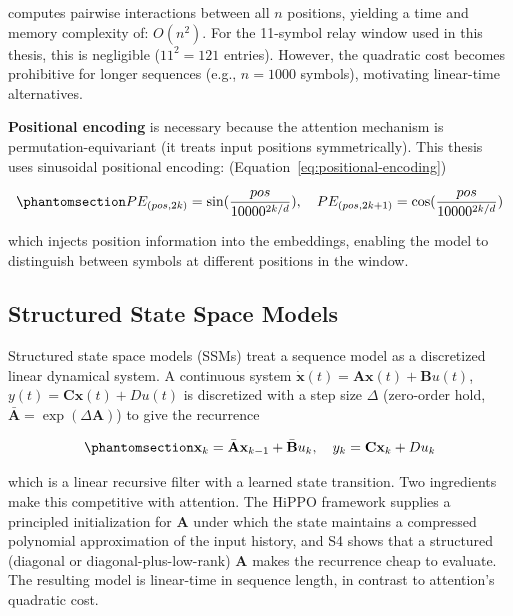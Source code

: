 computes pairwise interactions between all \(n\) positions, yielding a time and memory complexity of: $O(n^2)$. For the 11-symbol relay window used in this thesis, this is negligible (\(11^2 = 121\) entries). However, the quadratic cost becomes prohibitive for longer sequences (e.g., \(n = 1000\) symbols), motivating linear-time alternatives.

\textbf{Positional encoding} is necessary because the attention mechanism is permutation-equivariant (it treats input positions symmetrically). This thesis uses sinusoidal positional encoding: (Equation~\ref{eq:positional-encoding})

\begin{equation}\protect\phantomsection\label{eq:positional-encoding}{PE_{(pos, 2k)} = \sin(\frac{pos}{10000^{2k/d}}), \quad PE_{(pos, 2k+1)} = \cos(\frac{pos}{10000^{2k/d}})
}\end{equation}

which injects position information into the embeddings, enabling the model to distinguish between symbols at different positions in the window.

\subsection{Structured State Space Models}\label{sec:structured-state-space-models}

Structured state space models (SSMs) \cite{GuGoelRe2022SSM} treat a sequence model as a discretized linear dynamical system. A continuous system $\dot{\mathbf{x}}(t)=\mathbf{A}\mathbf{x}(t)+\mathbf{B}u(t)$, $y(t)=\mathbf{C}\mathbf{x}(t)+Du(t)$ is discretized with a step size $\Delta$ (zero-order hold, $\bar{\mathbf{A}}=\exp(\Delta\mathbf{A})$) to give the recurrence

\begin{equation}\protect\phantomsection\label{eq:ssm-discrete}{\mathbf{x}_k = \bar{\mathbf{A}} \mathbf{x}_{k-1} + \bar{\mathbf{B}} u_k, \quad y_k = \mathbf{C} \mathbf{x}_k + D u_k
}\end{equation}

which is a linear recursive filter with a learned state transition. Two ingredients make this competitive with attention. The HiPPO framework supplies a principled initialization for $\mathbf{A}$ under which the state maintains a compressed polynomial approximation of the input history, and S4 \cite{GuGoelRe2022SSM} shows that a structured (diagonal or diagonal-plus-low-rank) $\mathbf{A}$ makes the recurrence cheap to evaluate. The resulting model is linear-time in sequence length, in contrast to attention's quadratic cost.

